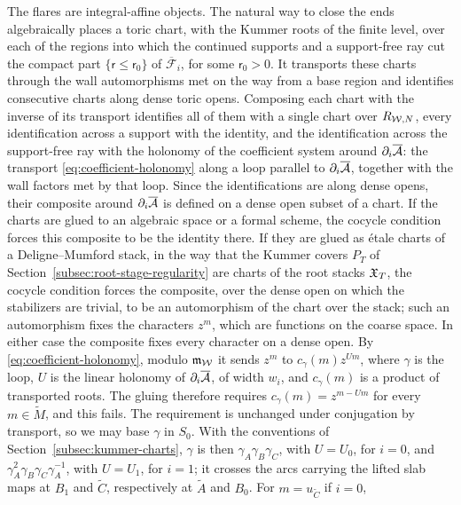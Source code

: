 \begin{remark}\label{rem:closing-ends}
The flares are integral-affine objects.  The natural way to close the ends
algebraically places a toric chart, with the Kummer roots of the finite
level, over each of the regions into which the continued supports and a
support-free ray cut the compact part $\{\mathsf r\leq\mathsf r_0\}$ of
$\overline{\mathcal F}_i$, for some $\mathsf r_0>0$.  It transports these
charts through the wall automorphisms met on the way from a base region and
identifies consecutive charts along dense toric opens.  Composing each
chart with the inverse of its transport identifies all of them with a
single chart over $R_{\mathcal W,N}$, every identification across a support with
the identity, and the identification across the support-free ray with the
holonomy of the coefficient system around $\partial_i\overline{\mathcal A}$: the
transport \eqref{eq:coefficient-holonomy}
along a loop parallel to $\partial_i\overline{\mathcal A}$, together with the wall
factors met by that loop.  Since the identifications are along dense opens,
their composite around $\partial_i\overline{\mathcal A}$ is defined on a dense open
subset of a chart.  If the charts are glued to an algebraic space or a
formal scheme, the cocycle condition forces this composite to be the
identity there.  If they are glued as \'etale charts of a Deligne--Mumford
stack, in the way that the Kummer covers $P_T$ of
Section~\ref{subsec:root-stage-regularity} are charts of the root stacks
$\mathfrak X_T$, the cocycle condition forces the composite, over the dense open
on which the stabilizers are trivial, to be an automorphism of the chart
over the stack; such an automorphism fixes the characters $z^m$, which are
functions on the coarse space.  In either case the composite fixes every
character on a dense open.  By \eqref{eq:coefficient-holonomy}, modulo
$\mathfrak m_\mathcal W$ it sends $z^m$ to $c_\gamma(m)z^{Um}$, where $\gamma$ is
the loop, $U$ is the linear holonomy of $\partial_i\overline{\mathcal A}$, of width
$w_i$, and $c_\gamma(m)$ is a product of transported roots.  The gluing
therefore requires $c_\gamma(m)=z^{m-Um}$ for every $m\in\widetilde M$, and
this fails.  The requirement is unchanged under conjugation by transport, so
we may base $\gamma$ in $S_0$.  With the conventions of
Section~\ref{subsec:kummer-charts}, $\gamma$ is then
$\gamma_A\gamma_B\gamma_C$, with $U=U_0$, for $i=0$, and
$\gamma_A^2\gamma_B\gamma_C\gamma_A^{-1}$, with $U=U_1$, for $i=1$; it
crosses the arcs carrying the lifted slab maps at $B_1$ and $\widetilde C$,
respectively at $\widetilde A$ and $B_0$.  For $m=u_{\widetilde C}$ if $i=0$,

\end{remark}
